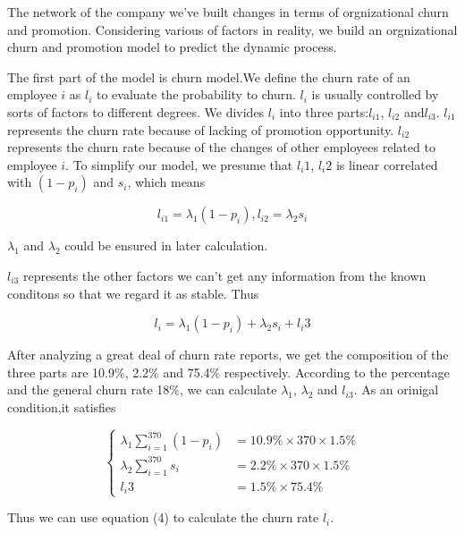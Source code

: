 \documentclass[12pt,a4paper,titlepage]{article}
\begin{document}
The network of the company we've built changes in terms of
orgnizational churn and promotion. Considering various of factors in
reality, we build an orgnizational churn and promotion model to
predict the dynamic process.

The first part of the model is churn model.We define the churn rate of
an employee $i$ as $l_i$ to evaluate the probability to churn. $l_i$ is
usually controlled by sorts of factors to different degrees. We
divides $l_i$ into three parts:$l_{i1}$, $l_{i2}$ and$l_{i3}$.  $l_{i1}$
represents the churn rate because of lacking of promotion
opportunity. $l_{i2}$ represents the churn rate because of the changes
of other employees related to employee $i$. To simplify our model, we
presume that $l_i1$, $l_i2$ is linear correlated with $(1-p_i)$ and
$s_i$, which means

\begin{equation}
  l_{i1}=\lambda_1(1-p_i),l_{i2}=\lambda_2s_i
\end{equation}

$\lambda_1$ and $\lambda_2$ could be ensured in later calculation.

$l_{i3}$ represents the other factors we can't get any information from
the known conditons so that we regard it as stable.  Thus

\begin{equation}
  l_i = \lambda_1(1-p_i) + \lambda_2s_i +l_i3
\end{equation}

After analyzing a great deal of churn rate reports, we get the
composition of the three parts are 10.9\%, 2.2\% and 75.4\%
respectively. According to the percentage and the general
churn rate 18\%, we can calculate $\lambda_1$, $\lambda_2$ and
$l_{i3}$. As an orinigal condition,it satisfies

\begin{equation}
\begin{cases}
  \lambda_1 \sum_{i=1}^{370}(1-p_i) & = 10.9\% \times 370 \times 1.5\% \\
  \lambda_2 \sum_{i=1}^{370}s_i & = 2.2\% \times 370 \times 1.5\% \\
  l_i3 & =1.5 \% \times 75.4 \%
\end{cases}
\end{equation}

Thus we can use equation (4) to calculate the churn rate $l_i$.
\end{document}
